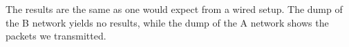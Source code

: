 The results are the same as one would expect from a wired setup. The dump of the B network yields no results, while the dump of the A network shows the packets we transmitted.
